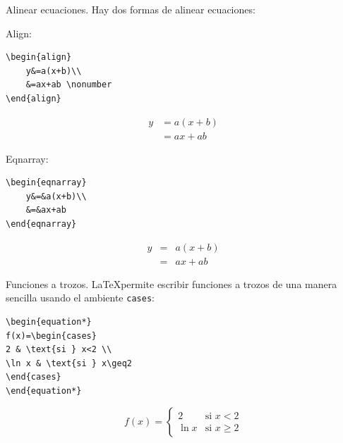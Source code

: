 \documentclass[dvipsnames,xcolor, handout]{beamer}
\theoremstyle{plain}
\theoremstyle{definition}
\begin{document}
\begin{frame}[fragile]{Alinear ecuaciones.}
    Hay dos formas de alinear ecuaciones:
    \begin{itemize}
    \begin{multicols}{2}
    \setlength{\columnseprule}{1pt} 
        \item Align:\\
        
\begin{verbatim}
\begin{align}
    y&=a(x+b)\\
    &=ax+ab \nonumber
\end{align}
\end{verbatim}
        \begin{align}
                y&=a(x+b)\\
                &=ax+ab \nonumber
            \end{align}
            \pause
        \columnbreak
        
        \item Eqnarray:\\
        
\vspace*{-0.2cm}\begin{verbatim}
\begin{eqnarray}
    y&=&a(x+b)\\
    &=&ax+ab
\end{eqnarray}
\end{verbatim}
\vspace*{-0.7cm}\begin{eqnarray}
                y&=&a(x+b)\\
                &=&ax+ab
            \end{eqnarray}
    \end{multicols}
    \end{itemize}
\end{frame}

\begin{frame}[fragile]{Funciones a trozos.}
\LaTeX permite escribir funciones a trozos de una manera sencilla usando el ambiente \verb!cases!:
\begin{multicols}{2}
\begin{verbatim}
\begin{equation*}
f(x)=\begin{cases}
2 & \text{si } x<2 \\
\ln x & \text{si } x\geq2
\end{cases}
\end{equation*}
\end{verbatim}

\begin{equation*}
f(x)=\begin{cases}
2 & \text{si } x<2 \\
\ln x & \text{si } x\geq2
\end{cases}
\end{equation*}
\end{multicols}
\end{frame}
\end{document}
